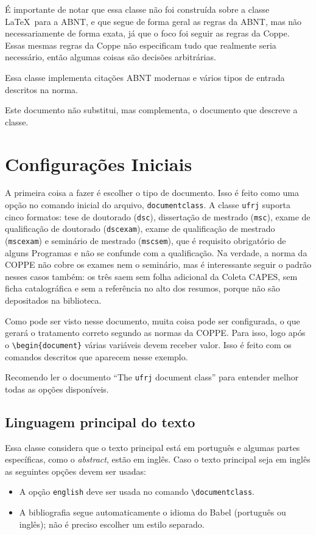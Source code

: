 \documentclass[dsc,pdfa,setavermelha]{ufrj}
\theoremstyle{plain}
\theoremstyle{definition}
\theoremstyle{remark}
\begin{document}
  É importante de notar que essa classe não foi construída sobre a classe \LaTeX \  para a ABNT, e que segue de forma geral as regras da ABNT, mas não necessariamente de forma exata, já que o foco foi seguir as regras da Coppe. Essas mesmas regras da Coppe não especificam tudo que realmente seria necessário, então algumas coisas são decisões arbitrárias.

  Essa classe implementa citações ABNT modernas e vários tipos de entrada descritos na norma.

  Este documento não substitui, mas complementa, o documento que descreve a classe.

\chapter{Configurações Iniciais}

   A primeira coisa a fazer é escolher o tipo de documento. Isso é feito como uma opção no comando inicial do arquivo, \verb|documentclass|. A classe \verb|ufrj| suporta cinco formatos: tese de doutorado (\verb|dsc|), dissertação de mestrado (\verb|msc|), exame de qualificação de doutorado (\verb|dscexam|), exame de qualificação de mestrado (\verb|mscexam|) e seminário de mestrado (\verb|mscsem|), que é requisito obrigatório de alguns Programas e não se confunde com a qualificação. Na verdade, a norma da COPPE não cobre os exames nem o seminário, mas é interessante seguir o padrão nesses casos também: os três saem sem folha adicional da Coleta CAPES, sem ficha catalográfica e sem a referência no alto dos resumos, porque não são depositados na biblioteca.

   Como pode ser visto nesse documento, muita coisa pode ser configurada, o que gerará o tratamento correto segundo as normas da COPPE. Para isso, logo após o \verb|\begin{document}| várias variáveis devem receber valor. Isso é feito com os comandos descritos que aparecem nesse exemplo.

   Recomendo ler o documento ``The \verb*|ufrj| document class'' para entender melhor todas as opções disponíveis.

\section{Linguagem principal do texto}

  Essa classe considera que o texto principal está em português e algumas partes específicas, como o \textit{abstract}, estão em inglês. Caso o texto principal seja em inglês as seguintes opções devem ser usadas:
 \begin{itemize}
 \item A opção \verb|english| deve ser usada no comando \verb|\documentclass|.
 \item A bibliografia segue automaticamente o idioma do Babel (português ou inglês); não é preciso escolher um estilo separado.
 \end{itemize}
\end{document}

